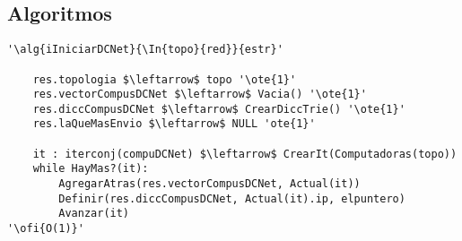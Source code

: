 \subsection{Algoritmos}


\begin{lstlisting}[mathescape]
'\alg{iIniciarDCNet}{\In{topo}{red}}{estr}'
	
    res.topologia $\leftarrow$ topo '\ote{1}'
    res.vectorCompusDCNet $\leftarrow$ Vacia() '\ote{1}'
    res.diccCompusDCNet $\leftarrow$ CrearDiccTrie() '\ote{1}'
    res.laQueMasEnvio $\leftarrow$ NULL 'ote{1}'

    it : iterconj(compuDCNet) $\leftarrow$ CrearIt(Computadoras(topo))
    while HayMas?(it):
    	AgregarAtras(res.vectorCompusDCNet, Actual(it))
    	Definir(res.diccCompusDCNet, Actual(it).ip, elpuntero)
    	Avanzar(it)
'\ofi{O(1)}'
\end{lstlisting}


